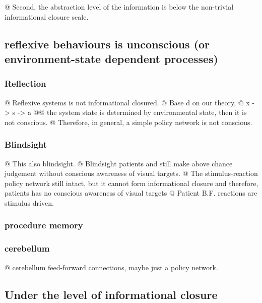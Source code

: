 \documentclass[utf8]{article}
\begin{document}
\begin{backup}
\begin{ants}
			@ Second, the abstraction level of the information is below the non-trivial informational closure scale.
		\end{ants}



		\subsection{reflexive behaviours is unconscious (or environment-state dependent processes)}\label{sec:reflexive}
		\subsubsection{Reflection}
		\begin{ants}
			@ Reflexive systems is not informational closured.
			@ Base	d on our theory,
			@ x -> s -> a
			@@ the system state is determined by environmental state, then it is not conscious.
			@ Therefore, in general, a simple policy network is not conscious.
		\end{ants}

		\subsubsection{Blindsight}
		\begin{ants}
			@ This also blindsight.
			@ Blindsight patients and still make above chance judgement without conscious awareness of visual targets.
			@ The stimulus-reaction policy network still intact, but it cannot form informational closure and therefore, patients has no conscious awareness of visual  targets
			@ Patient B.F. reactions are stimulus driven.
		\end{ants}

		\subsubsection{procedure memory}

		\subsubsection{cerebellum}
		\begin{ants}
			@ cerebellum feed-forward connections, maybe just a policy network.
		\end{ants}

		\subsection{Under the level of informational closure}

\end{backup}
\end{document}
